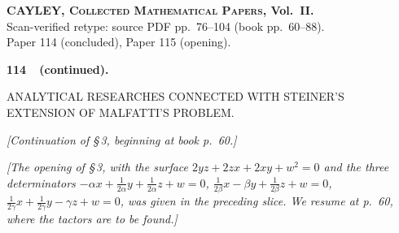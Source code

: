 \documentclass[11pt]{article}
\begin{document}
\begin{center}
{\large\bfseries CAYLEY, \textsc{Collected Mathematical Papers}, Vol.\ II.}\\[0.3em]
{\small Scan-verified retype: source PDF pp.\ 76--104 (book pp.\ 60--88).}\\[0.2em]
{\footnotesize Paper 114 (concluded), Paper 115 (opening).}
\end{center}

\bigskip


\begin{center}\textbf{114\ \ (continued).}\par\medskip
{\large ANALYTICAL RESEARCHES CONNECTED WITH STEINER'S\\
EXTENSION OF MALFATTI'S PROBLEM.}
\end{center}

\noindent\emph{[Continuation of \S\,3, beginning at book p.~60.]}

\bigskip

\noindent\emph{[The opening of \S\,3, with the surface $2yz + 2zx + 2xy + w^{2} = 0$ and the three determinators
$-\alpha x + \tfrac{1}{2\alpha}y + \tfrac{1}{2\alpha}z + w = 0$, $\tfrac{1}{2\beta}x - \beta y + \tfrac{1}{2\beta}z + w = 0$,
$\tfrac{1}{2\gamma}x + \tfrac{1}{2\gamma}y - \gamma z + w = 0$, was given in the preceding slice.
We resume at p.~60, where the tactors are to be found.]}

\bigskip
\end{document}
